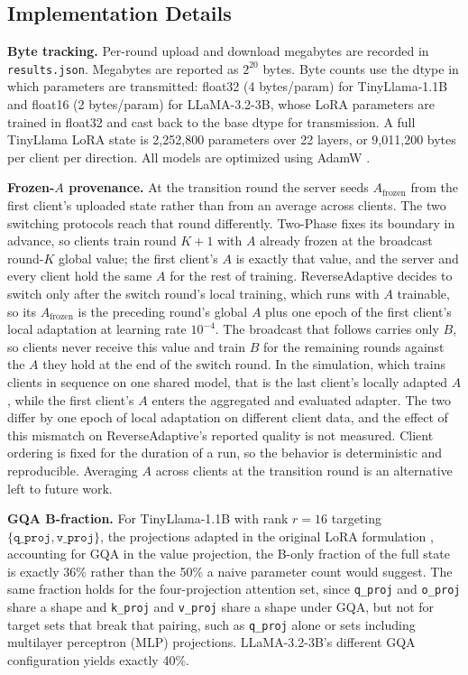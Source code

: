 \subsection{Implementation Details}
\label{sec:implementation}
\textbf{Byte tracking.}
Per-round upload and download megabytes are recorded in \texttt{results.json}. Megabytes are reported as $2^{20}$ bytes. Byte counts use the dtype in which parameters are transmitted: float32 (4 bytes/param) for TinyLlama-1.1B and float16 (2 bytes/param) for LLaMA-3.2-3B, whose LoRA parameters are trained in float32 and cast back to the base dtype for transmission. A full TinyLlama LoRA state is 2{,}252{,}800 parameters over 22 layers, or 9{,}011{,}200 bytes per client per direction. All models are optimized using AdamW \cite{loshchilov2019decoupled}.

\textbf{Frozen-$A$ provenance.} At the transition round the server seeds $A_{\text{frozen}}$ from the first client's uploaded state rather than from an average across clients. The two switching protocols reach that round differently. Two-Phase fixes its boundary in advance, so clients train round $K{+}1$ with $A$ already frozen at the broadcast round-$K$ global value; the first client's $A$ is exactly that value, and the server and every client hold the same $A$ for the rest of training. ReverseAdaptive decides to switch only after the switch round's local training, which runs with $A$ trainable, so its $A_{\text{frozen}}$ is the preceding round's global $A$ plus one epoch of the first client's local adaptation at learning rate $10^{-4}$. The broadcast that follows carries only $B$, so clients never receive this value and train $B$ for the remaining rounds against the $A$ they hold at the end of the switch round. In the simulation, which trains clients in sequence on one shared model, that is the last client's locally adapted $A$, while the first client's $A$ enters the aggregated and evaluated adapter. The two differ by one epoch of local adaptation on different client data, and the effect of this mismatch on ReverseAdaptive's reported quality is not measured. Client ordering is fixed for the duration of a run, so the behavior is deterministic and reproducible. Averaging $A$ across clients at the transition round is an alternative left to future work.

\textbf{GQA B-fraction.}
For TinyLlama-1.1B with rank $r{=}16$ targeting $\{\texttt{q\_proj}, \texttt{v\_proj}\}$, the projections adapted in the original LoRA formulation \cite{hu2022lora}, accounting for GQA in the value projection, the B-only fraction of the full state is exactly 36\% rather than the 50\% a naive parameter count would suggest. The same fraction holds for the four-projection attention set, since \texttt{q\_proj} and \texttt{o\_proj} share a shape and \texttt{k\_proj} and \texttt{v\_proj} share a shape under GQA, but not for target sets that break that pairing, such as \texttt{q\_proj} alone or sets including multilayer perceptron (MLP) projections. LLaMA-3.2-3B's different GQA configuration yields exactly 40\%.

